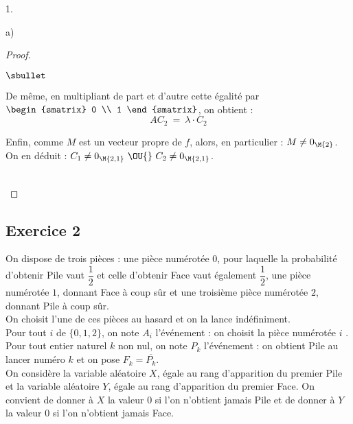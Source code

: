 \documentclass[11pt]{article}%
\begin{document}
\begin{noliste}{1.}
\begin{noliste}{a)}
\begin{proof}
\begin{noliste}{$\sbullet$}


      \item De même, en multipliant de part et d'autre cette égalité par $
        \begin{smatrix}
          0 \\
          1
        \end{smatrix}
        $, on obtient :
        \[
        A C_2 \ = \ \lambda \cdot C_2
        \]

      \item Enfin, comme $M$ est un vecteur propre de $f$, alors, en
        particulier : $M \neq 0_{\M{2}}$.\\
        On en déduit : $C_1 \neq 0_{\M{2,1}} \ \OU{} \ C_2 \neq
        0_{\M{2,1}}$.
      \end{noliste}
      ~\\[-1.4cm]
    \end{proof}
  \end{noliste}
\end{noliste}




\subsection*{Exercice 2}

\noindent
On dispose de trois pièces : une pièce numérotée $0$, pour laquelle la
probabilité d'obtenir Pile vaut $\dfrac{1}{2}$ et celle d'obtenir Face
vaut également $\dfrac{1}{2}$, une pièce numérotée $1$, donnant Face à
coup sûr et une troisième pièce numérotée $2$, donnant Pile à coup
sûr.\\
On choisit l'une de ces pièces au hasard et on la lance
indéfiniment.\\
Pour tout $i$ de $\{0, 1, 2\}$, on note $A_i$ l'événement : \og on
choisit la pièce numérotée $i$ \fg{}.\\
Pour tout entier naturel $k$ non nul, on note $P_k$ l'événement : \og
on obtient Pile au lancer numéro $k$ \fg{} et on pose $F_k =
\overline{P_k}$.\\
On considère la variable aléatoire $X$, égale au rang d'apparition du
premier Pile et la variable aléatoire $Y$, égale au rang d'apparition
du premier Face. On convient de donner à $X$ la valeur $0$ si l'on
n'obtient jamais Pile et de donner à $Y$ la valeur $0$ si l'on
n'obtient jamais Face.
\end{document}
